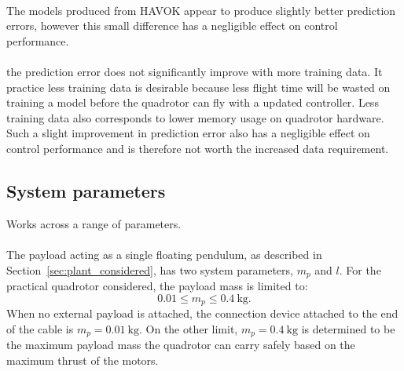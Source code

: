         \paragraph{}
        The models produced from HAVOK appear to produce slightly better prediction errors, however this small difference has a negligible effect on control performance.

        \paragraph{}
        the prediction error does not significantly improve with more training data.
        It practice less training data is desirable because less flight time will be wasted on training a model before the quadrotor can fly with a updated controller.
        Less training data also corresponds to lower memory usage on quadrotor hardware.
        Such a slight improvement in prediction error also has a negligible effect on control performance and is therefore not worth the increased data requirement.


    \subsection{System parameters}
            
        Works across a range of parameters.

        \paragraph{}
        The payload acting as a single floating pendulum, as described in Section~\ref{sec:plant_considered},
        has two system parameters, $m_p$ and $l$.
        For the practical quadrotor considered, the payload mass is limited to:
        \begin{equation}
            0.01 \leq m_p \leq \SI{0.4}{\kilo\gram} .
        \end{equation}
        When no external payload is attached, the connection device attached to the end of the cable is 
        $m_p = \SI{0.01}{\kilo\gram}$.
        On the other limit, $m_p = \SI{0.4}{\kilo\gram}$ is determined to be the maximum payload mass the quadrotor can carry safely 
        based on the maximum thrust of the motors.

